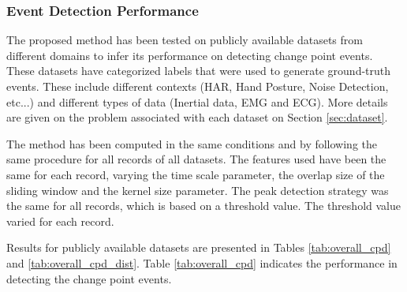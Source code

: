 \subsubsection{Event Detection Performance}

The proposed method has been tested on publicly available datasets from different domains to infer its performance on detecting change point events. These datasets have categorized labels that were used to generate ground-truth events. These include different contexts (HAR, Hand Posture, Noise Detection, etc...) and different types of data (Inertial data, EMG and ECG). More details are given on the problem associated with each dataset on Section \ref{sec:dataset}.
\par
The method has been computed in the same conditions and by following the same procedure for all records of all datasets. The features used have been the same for each record, varying the time scale parameter, the overlap size of the sliding window and the kernel size parameter. The peak detection strategy was the same for all records, which is based on a threshold value. The threshold value varied for each record.  
\par
Results for publicly available datasets are presented in Tables \ref{tab:overall_cpd} and \ref{tab:overall_cpd_dist}. Table \ref{tab:overall_cpd} indicates the performance in detecting the change point events. 



